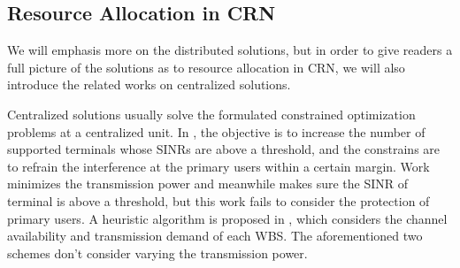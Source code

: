 

\subsection{Resource Allocation in CRN}

We will emphasis more on the distributed solutions, but in order to give readers a full picture of the solutions as to resource allocation in CRN, we will also introduce the related works on centralized solutions.

Centralized solutions usually solve the formulated constrained optimization problems at a centralized unit.
In \cite{downlink-centralized-08-TWC}, the objective is to increase the number of supported terminals whose SINRs are above a threshold, and the constrains are to refrain the interference at the primary users within a certain margin.
Work \cite{joint_power_channel_linkpair_08ICT} minimizes the transmission power and meanwhile makes sure the SINR of terminal is above a threshold, but this work fails to consider the protection of primary users.
A heuristic algorithm is proposed in \cite{centralized_80222_sharing_ifip2011}, which considers the channel availability and transmission demand of each WBS.
The aforementioned two schemes don't consider varying the transmission power.

